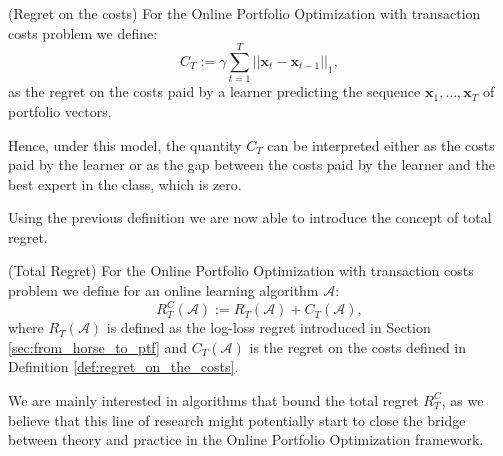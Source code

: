 \begin{definition}(Regret on the costs)\label{def:regret_on_the_costs}
For the Online Portfolio Optimization with transaction costs problem we define:
\begin{equation}
C_T:=\gamma\sum\limits_{t=1}^T||\mathbf x_t-\mathbf x_{t-1}||_1,
\end{equation}
as the regret on the costs paid by a learner predicting the sequence $\mathbf x_1,\ldots,\mathbf x_T$ of portfolio vectors.
\end{definition}

Hence, under this model, the quantity $C_T$ can be interpreted either as the costs paid by the learner or as the gap between the costs paid by the learner and the best expert in the class, which is zero.

Using the previous definition we are now able to introduce the concept of total regret.

\begin{definition}(Total Regret)\label{def:totoal_regret}
For the Online Portfolio Optimization with transaction costs problem we define for an online learning algorithm $\mathcal A$: 
\begin{equation}
R_T^C(\mathcal A):=R_T(\mathcal A)+C_T(\mathcal A),
\end{equation}
where $R_T(\mathcal A)$ is defined as the log-loss regret introduced in Section \ref{sec:from_horse_to_ptf} and $C_T(\mathcal A)$ is the regret on the costs defined in Definition \ref{def:regret_on_the_costs}.
\end{definition}

We are mainly interested in algorithms that bound the total regret $R_T^C$, as we believe that this line of research might potentially start to close the bridge between theory and practice in the Online Portfolio Optimization framework.


